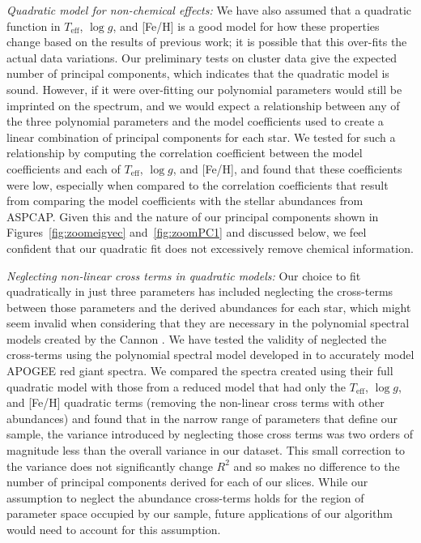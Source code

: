 \documentclass[a4paper,fleqn,usenatbib]{mnras}
\newcommand       \teff     {{T_{\mathrm{eff}}}}
\begin{document}
\textit{Quadratic model for non-chemical effects:} We have also assumed that a quadratic function in $\teff$, $\log g$, and [Fe/H] is a good model for how these properties change based on the results of previous work; it is possible that this over-fits the actual data variations. Our preliminary tests on cluster data give the expected number of principal components, which indicates that the quadratic model is sound. However, if it were over-fitting our polynomial parameters would still be imprinted on the spectrum, and we would expect a relationship between any of the three polynomial parameters and the model coefficients used to create a linear combination of principal components for each star. We tested for such a relationship by computing the correlation coefficient between the model coefficients and each of $\teff$, $\log g$, and [Fe/H], and found that these coefficients were low, especially when compared to the correlation coefficients that result from comparing the model coefficients with the stellar abundances from ASPCAP. Given this and the nature of our principal components shown in Figures~\ref{fig:zoomeigvec} and~\ref{fig:zoomPC1} and discussed below, we feel confident that our quadratic fit does not excessively remove chemical information.

\textit{Neglecting non-linear cross terms in quadratic models:} Our choice to fit quadratically in just three parameters has included neglecting the cross-terms between those parameters and the derived abundances for each star, which might seem invalid when considering that they are necessary in the polynomial spectral models created by the Cannon \citep{Casey2016a}. We have tested the validity of neglected the cross-terms using the polynomial spectral model developed in \citep{Rix2016} to accurately model APOGEE red giant spectra. We compared the spectra created using their full quadratic model with those from a reduced model that had only the $\teff$, $\log g$, and [Fe/H] quadratic terms (removing the non-linear cross terms with other abundances) and found that in the narrow range of parameters that define our sample, the variance introduced by neglecting those cross terms was two orders of magnitude less than the overall variance in our dataset. This small correction to the variance does not significantly change $R^2$ and so makes no difference to the number of principal components derived for each of our slices. While our assumption to neglect the abundance cross-terms holds for the region of parameter space occupied by our sample, future applications of our algorithm would need to account for this assumption.
\end{document}
